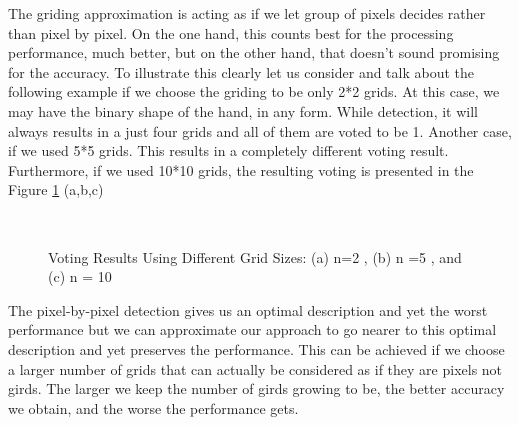 The griding approximation is acting as if we let group of pixels decides rather than pixel by pixel. On the one hand, this counts best for the processing performance, much better, but on the other hand, that doesn't sound promising for the accuracy. To illustrate this clearly let us consider and talk about the following example if we choose the griding to be only 2*2 grids. At this case, we may have the binary shape of the hand, in any form. While detection, it will always results in a just four grids and all of them are voted to be 1. Another case, if we used 5*5 grids. This results in a completely different voting result. Furthermore, if we used 10*10 grids, the resulting voting is presented in the Figure \ref{fig:bin_sizes} (a,b,c)
\begin{figure}[h]
\begin{dBox}
\centering
  \mbox{
   }
   \caption{Voting Results Using Different Grid Sizes: (a) n=2 , (b) n =5 , and (c) n = 10  \label{fig:bin_sizes} }   
\end{dBox}   
\end{figure}
\bigskip

The pixel-by-pixel detection gives us an optimal description and yet the worst performance but we can approximate our approach to go nearer to this optimal description and yet preserves the performance. This can be achieved if we choose a larger number of grids that can actually be considered as if they are pixels not girds. The larger we keep the number of girds growing to be, the better accuracy we obtain, and the worse the performance gets.\bigskip


